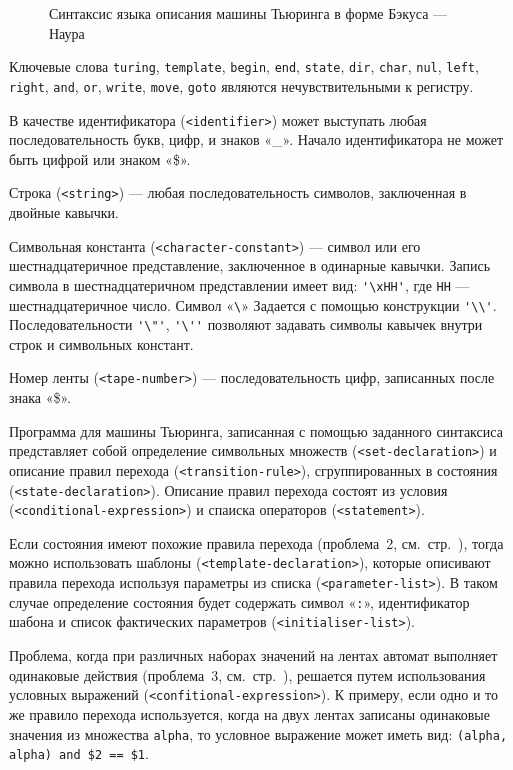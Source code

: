 \documentclass[10pt, normalheadings]{scrartcl}
\begin{document}
\begin{multicols}{2}
\begin{figure*}[p]
	\centering
	\inputminted[fontsize=\footnotesize]{bnf}{bnf/turing.bnf}
	\caption{Синтаксис языка описания машины Тьюринга в форме Бэкуса --- Наура}\label{fig:bnf_turing}
\end{figure*}

Ключевые слова \texttt{turing}, \texttt{template}, \texttt{begin}, \texttt{end}, \texttt{state}, \texttt{dir}, \texttt{char}, \texttt{nul}, \texttt{left}, \texttt{right}, \texttt{and}, \texttt{or}, \texttt{write}, \texttt{move}, \texttt{goto} являются нечувствительными к регистру.

В качестве идентификатора (\verb|<identifier>|) может выступать любая последовательность букв, цифр, и знаков «\_». Начало идентификатора не может быть цифрой или знаком «\$».

Строка (\verb|<string>|) --- любая последовательность символов, заключенная в двойные кавычки.

Символьная константа (\verb|<character-constant>|) --- символ или его шестнадцатеричное представление, заключенное в одинарные кавычки. Запись символа в шестнадцатеричном представлении имеет вид: \verb|'\xHH'|, где \texttt{HH} --- шестнадцатеричное число. Символ «\verb|\|» Задается с помощью конструкции \verb|'\\'|. Последовательности \verb|'\"'|, \verb|'\''| позволяют задавать символы кавычек внутри строк и символьных констант.

Номер ленты (\verb|<tape-number>|) --- последовательность цифр, записанных после знака «\$».

Программа для машины Тьюринга, записанная с помощью заданного синтаксиса представляет собой определение символьных множеств (\verb|<set-declaration>|) и описание правил перехода (\verb|<transition-rule>|), сгруппированных в состояния (\verb|<state-declaration>|). Описание правил перехода состоят из условия (\verb|<conditional-expression>|) и спаиска операторов (\verb|<statement>|).

Если состояния имеют похожие правила перехода (проблема~2, см.~стр.~\pageref{item:task2}), тогда можно использовать шаблоны (\verb|<template-declaration>|), которые описивают правила перехода используя параметры из списка (\verb|<parameter-list>|). В таком случае определение состояния будет содержать символ «\verb|:|», идентификатор шабона и список фактических параметров (\verb|<initialiser-list>|).

Проблема, когда при различных наборах значений на лентах автомат выполняет одинаковые действия (проблема~3, см.~стр.~\pageref{item:task3}), решается путем использования условных выражений (\verb|<confitional-expression>|). К примеру, если одно и то же правило перехода используется, когда на двух лентах записаны одинаковые значения из множества \texttt{alpha}, то условное выражение может иметь вид: \verb|(alpha, alpha) and $2 == $1|.


\end{multicols}
\end{document}
